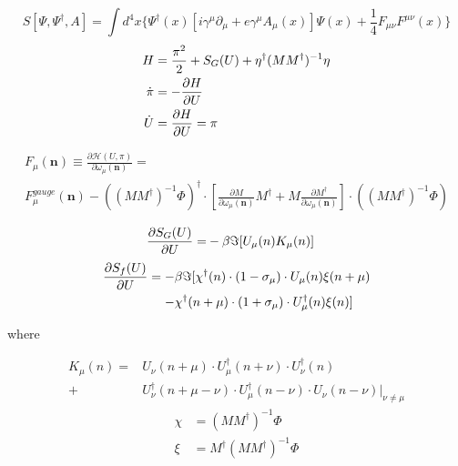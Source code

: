 \documentclass[10pt]{beamer}
\begin{document}
\begin{frame}
    \begin{equation}
        S[\Psi,\Psi^{\dagger},A] = \int{d^4x \{\Psi^\dagger(x)\left[i\gamma^\mu\partial_\mu + e\gamma^\mu A_\mu(x) \right]\Psi(x) +\frac{1}{4} F_{\mu\nu}F^{\mu\nu}(x) \}} 
    \end{equation}
    \begin{align}
        H &= \frac{\pi^2}{2} + S_G(U) + \eta^\dagger (MM^\dagger)^{-1}\eta \\
        \dot\pi & = - \diffp{H}{U} \\
        \dot U &= \diffp{H}{U} = \pi \\ \end{align} \end{frame}

\begin{frame}

    \begin{equation}
        \begin{gathered}
        F_\mu(\textbf{n}) \equiv \frac{\partial \mathcal{H}(U,\pi)}{\partial \omega_{\mu}(\textbf{n})}
                 = \\ F^{gauge}_{\mu}(\textbf{n})
                 - \left( \left(M M^\dagger\right)^{-1} \Phi \right)^\dagger \cdot
                 \left[ \frac{\partial M}{\partial \omega_{\mu}(\textbf{n})} M^\dagger + M\frac{\partial M^\dagger}{\partial \omega_{\mu}(\textbf{n})}\right] \cdot
                 \left( \left(M M^\dagger\right)^{-1} \Phi \right)
        \end{gathered}
        \end{equation}
        
    \begin{align}
        \diffp{S_G(U)}{U} =& - \beta \Im[U_\mu(n)K_\mu(n)]
    \end{align}
    \begin{align}
        \diffp{S_f(U)}{U} = -& \beta \Im[\chi^\dagger(n)\cdot(1-\sigma_\mu)\cdot U_\mu(n)\xi(n+\mu) \\ 
                            -&\chi^\dagger(n+\mu)\cdot (1+\sigma_\mu)\cdot U_\mu^\dagger(n)\xi(n)]\end{align}
    
\end{frame}
\begin{frame}
    \begin{center}
        where
    \end{center}
    \begin{align}
        K_{\mu}(n) = &U_{\nu}(n+\mu) \cdot U_{\mu}^\dagger(n+\nu) \cdot U_{\nu}^\dagger(n)  \\
                    +& U_{\nu}^\dagger(n+\mu-\nu) \cdot U_{\mu}^\dagger(n-\nu) \cdot U_{\nu}(n-\nu)\vert_{\nu\neq\mu}
    \end{align}
    \begin{align}
        \chi &= (MM^\dagger)^{-1}\Phi\\
        \xi &= M^\dagger(MM^\dagger)^{-1}\Phi
    \end{align}
\end{frame}
\end{document}

